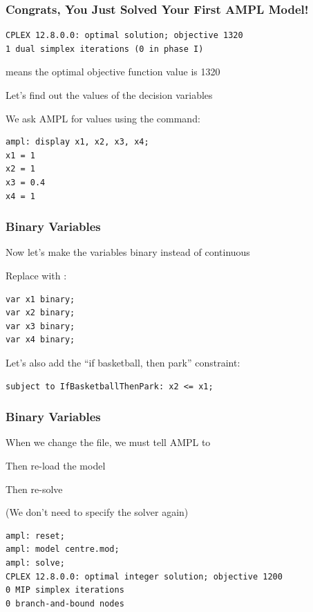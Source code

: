 \begin{frame}[fragile]

	\frametitle{Congrats, You Just Solved Your First AMPL Model!}
	
\begin{lstlisting}
CPLEX 12.8.0.0: optimal solution; objective 1320
1 dual simplex iterations (0 in phase I)
\end{lstlisting}

	\bit
	\item {} means the optimal objective function value is 1320
	\item Let's find out the values of the decision variables
	\item We ask AMPL for values using the  command:
	\eit

\begin{lstlisting}
ampl: display x1, x2, x3, x4;
x1 = 1
x2 = 1
x3 = 0.4
x4 = 1
\end{lstlisting}

\end{frame}

\begin{frame}[fragile]

	\frametitle{Binary Variables}
	
	\bit
	\item Now let's make the variables binary instead of continuous
	\item Replace  with :
	\eit
	
\begin{lstlisting}
var x1 binary;
var x2 binary;
var x3 binary;
var x4 binary;
\end{lstlisting}

	\bit
	\item Let's also add the ``if basketball, then park'' constraint:
	\eit
	
\begin{lstlisting}
subject to IfBasketballThenPark: x2 <= x1;
\end{lstlisting}

\end{frame}

\begin{frame}[fragile]

	\frametitle{Binary Variables}
	
	\bit
	\item When we change the  file, we must tell AMPL to 
	\item Then re-load the model
	\item Then re-solve
	\item (We don't need to specify the solver again)
	\eit

\begin{lstlisting}
ampl: reset;
ampl: model centre.mod;
ampl: solve;
CPLEX 12.8.0.0: optimal integer solution; objective 1200
0 MIP simplex iterations
0 branch-and-bound nodes
\end{lstlisting}

\end{frame}

